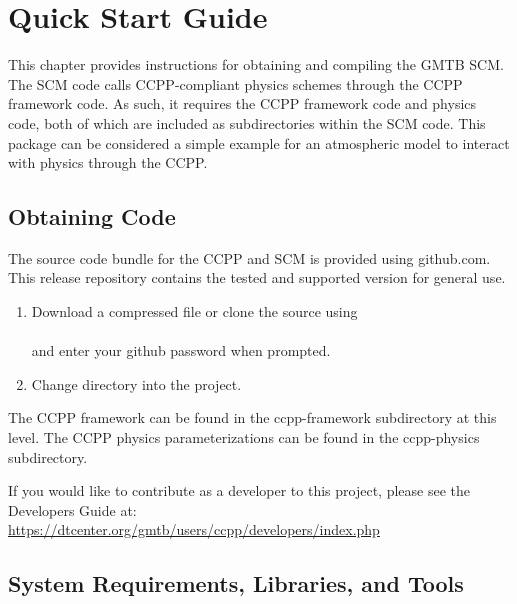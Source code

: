 \chapter{Quick Start Guide}
\label{chapter: quick}
\setlength{\parskip}{12pt}

This chapter provides instructions for obtaining and compiling 
the GMTB SCM. The SCM code calls CCPP-compliant
physics schemes through the CCPP framework code. As such, it requires the
CCPP framework code and physics code, both of which are included as 
subdirectories within the SCM code. This package can be considered a simple example
for an atmospheric model to interact with physics through the CCPP.

\section{Obtaining Code}

The source code bundle for the CCPP and SCM is provided using github.com.  This release repository contains the tested and supported version for general use.  

\begin{enumerate}

	\item Download a compressed file or clone the source using\\

	\\

	and enter your github password when prompted.\\

	\item Change directory into the project.\\


\end{enumerate}

The CCPP framework can be found in the ccpp-framework subdirectory at this level.  The CCPP physics parameterizations can be found in the ccpp-physics subdirectory.

If you would like to contribute as a developer to this project, please see the Developers Guide at:\\

\url{https://dtcenter.org/gmtb/users/ccpp/developers/index.php}


\section{System Requirements, Libraries, and Tools}
\label{section: systemrequirements}

